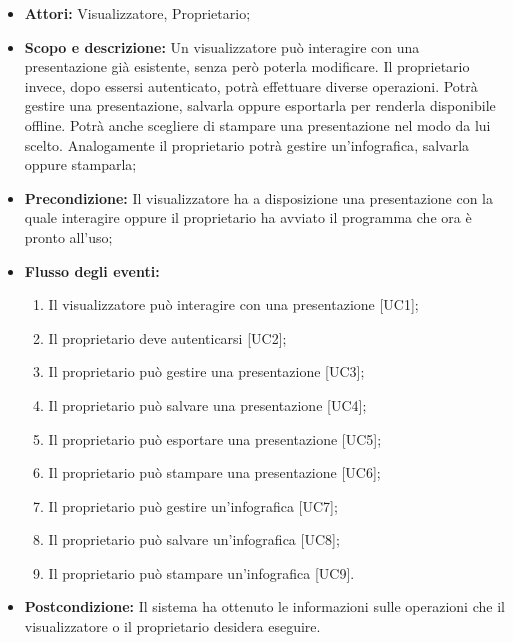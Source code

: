 \begin{itemize}
	\item \textbf{Attori:} Visualizzatore, Proprietario;
	\item \textbf{Scopo e descrizione:} Un visualizzatore può interagire con una presentazione già esistente, senza però poterla modificare. Il proprietario invece, dopo essersi autenticato, potrà effettuare diverse operazioni. Potrà gestire una presentazione, salvarla oppure esportarla per renderla disponibile offline. Potrà anche scegliere di stampare una presentazione nel modo da lui scelto. Analogamente il proprietario potrà gestire un'\gls{infografica}, salvarla oppure stamparla;
	\item \textbf{Precondizione:} Il visualizzatore ha a disposizione una presentazione con la quale interagire oppure il proprietario ha avviato il programma che ora è pronto all'uso;
	\item \textbf{Flusso degli eventi:}
	\begin{enumerate}
		\item Il visualizzatore può interagire con una presentazione [UC1];
		\item Il proprietario deve autenticarsi [UC2];
		\item Il proprietario può gestire una presentazione [UC3];
		\item Il proprietario può salvare una presentazione [UC4];
		\item Il proprietario può esportare una presentazione [UC5];
		\item Il proprietario può stampare una presentazione [UC6];
		\item Il proprietario può gestire un'infografica [UC7];
		\item Il proprietario può salvare un'infografica [UC8];
		\item Il proprietario può stampare un'infografica [UC9].
	\end{enumerate}
	\item \textbf{Postcondizione:} Il sistema ha ottenuto le informazioni sulle operazioni che il visualizzatore o il proprietario desidera eseguire.
\end{itemize}





















